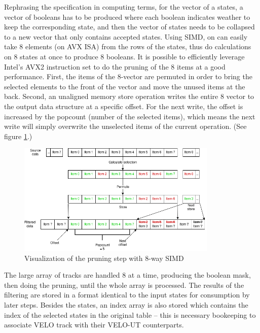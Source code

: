 \documentclass[12pt]{article}
\begin{document}
Rephrasing the specification in computing terms, for the vector of a states, a vector of booleans has to be produced where each boolean indicates weather to keep the corresponding state, and then the vector of states needs to be collapsed to a new vector that only contains accepted states. Using SIMD, on can easily take 8 elements (on AVX ISA) from the rows of the states, thus do calculations on 8 states at once to produce 8 booleans. It is possible to efficiently leverage Intel's AVX2 instruction set to do the pruning of the 8 items at a good performance\cite{lemire_simd_prune}. First, the items of the 8-vector are permuted in order to bring the selected elements to the front of the vector and move the unused items at the back. Second, an unaligned memory store operation writes the entire 8 vector to the output data structure at a specific offset. For the next write, the offset is increased by the popcount (number of the selected items), which means the next write will simply overwrite the unselected items of the current operation. (See figure \ref{fig_velout_opt_simd_filter}.)

\begin{figure}[H]
	\begin{center}
		\includegraphics[width=0.85\textwidth]{velout_opt_simd_filter}
	\end{center}
	\caption{Visualization of the pruning step with 8-way SIMD}
	\label{fig_velout_opt_simd_filter}
\end{figure}

The large array of tracks are handled 8 at a time, producing the boolean mask, then doing the pruning, until the whole array is processed. The results of the filtering are stored in a format identical to the input states for consumption by later steps. Besides the states, an index array is also stored which contains the index of the selected states in the original table -- this is necessary bookeeping to associate VELO track with their VELO-UT counterparts.
\end{document}
